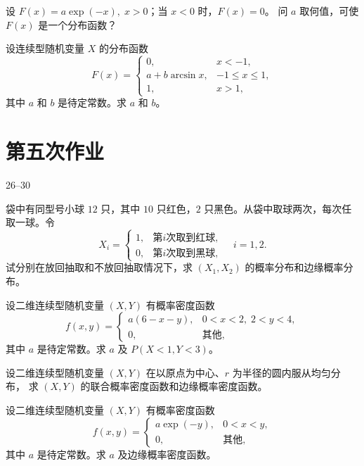 \begin{homework}[2.24]
设 $F(x) = a \exp(-x), \; x > 0$；当 $x < 0$ 时，$F(x) = 0$。  
问 $a$ 取何值，可使 $F(x)$ 是一个分布函数？
\end{homework}

\begin{homework}[2.25]
设连续型随机变量 $X$ 的分布函数
\[
F(x) =
\begin{cases}
0, & x < -1, \\[6pt]
a + b \arcsin x, & -1 \leq x \leq 1, \\[6pt]
1, & x > 1,
\end{cases}
\]
其中 $a$ 和 $b$ 是待定常数。求 $a$ 和 $b$。
\end{homework}
\section{第五次作业}
26--30

\begin{homework}[26]
袋中有同型号小球 $12$ 只，其中 $10$ 只红色，$2$ 只黑色。从袋中取球两次，每次任取一球。令
\[
X_i =
\begin{cases}
1, & 第 i 次取到红球, \\
0, & 第 i 次取到黑球,
\end{cases}
\quad i=1,2.
\]
试分别在放回抽取和不放回抽取情况下，求 $(X_1, X_2)$ 的概率分布和边缘概率分布。
\end{homework}

\begin{homework}[27]
设二维连续型随机变量 $(X,Y)$ 有概率密度函数
\[
f(x,y) =
\begin{cases}
a(6 - x - y), & 0 < x < 2,\; 2 < y < 4, \\[6pt]
0, & \text{其他},
\end{cases}
\]
其中 $a$ 是待定常数。求 $a$ 及 $P(X < 1, Y < 3)$。
\end{homework}

\begin{homework}[28]
设二维连续型随机变量 $(X,Y)$ 在以原点为中心、$r$ 为半径的圆内服从均匀分布，
求 $(X,Y)$ 的联合概率密度函数和边缘概率密度函数。
\end{homework}

\begin{homework}[29]
设二维连续型随机变量 $(X,Y)$ 有概率密度函数
\[
f(x,y) =
\begin{cases}
a \exp(-y), & 0 < x < y, \\[6pt]
0, & \text{其他},
\end{cases}
\]
其中 $a$ 是待定常数。求 $a$ 及边缘概率密度函数。
\end{homework}


